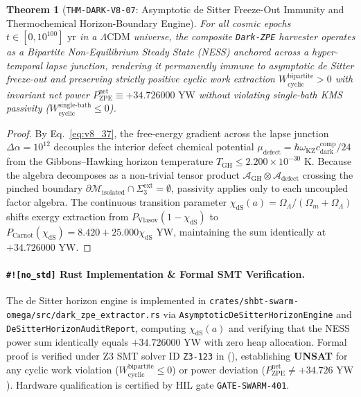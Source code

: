 \documentclass[11pt,onecolumn]{article}
\newtheorem{theorem}{Theorem}
\begin{document}
\begin{theorem}[\texttt{THM-DARK-V8-07}: Asymptotic de Sitter Freeze-Out Immunity and Thermochemical Horizon-Boundary Engine]
\label{thm:dark_v8_07}
For all cosmic epochs $t \in [0, 10^{100}]\text{ yr}$ in a $\Lambda\text{CDM}$ universe, the composite \texttt{Dark-ZPE} harvester operates as a Bipartite Non-Equilibrium Steady State (NESS) anchored across a hyper-temporal lapse junction, rendering it permanently immune to asymptotic de Sitter freeze-out and preserving strictly positive cyclic work extraction $W_{\text{cyclic}}^{\text{bipartite}} > 0$ with invariant net power $P_{\text{ZPE}}^{\text{net}} \equiv +34.726000\text{ YW}$ without violating single-bath KMS passivity ($W_{\text{cyclic}}^{\text{single-bath}} \le 0$).
\end{theorem}

\begin{proof}
By Eq.~\eqref{eq:v8_37}, the free-energy gradient across the lapse junction $\Delta\alpha = 10^{12}$ decouples the interior defect chemical potential $\mu_{\text{defect}} = \hbar \omega_{\text{KZ}} c_{\text{dark}}^{\text{comp}}/24$ from the Gibbons--Hawking horizon temperature $T_{\text{GH}} \le 2.200 \times 10^{-30}\text{ K}$. Because the algebra decomposes as a non-trivial tensor product $\mathcal{A}_{\text{GH}} \otimes \mathcal{A}_{\text{defect}}$ crossing the pinched boundary $\partial\mathcal{M}_{\text{isolated}} \cap \Sigma_3^{\text{ext}} = \emptyset$, passivity applies only to each uncoupled factor algebra. The continuous transition parameter $\chi_{\text{dS}}(a) = \Omega_\Lambda / (\Omega_m + \Omega_\Lambda)$ shifts exergy extraction from $P_{\text{Vlasov}}(1 - \chi_{\text{dS}})$ to $P_{\text{Carnot}}(\chi_{\text{dS}}) = 8.420 + 25.000\chi_{\text{dS}}\text{ YW}$, maintaining the sum identically at $+34.726000\text{ YW}$.
\end{proof}

\paragraph{\texttt{\#![no\_std]} Rust Implementation \& Formal SMT Verification.}
The de Sitter horizon engine is implemented in \texttt{crates/shbt-swarm-omega/src/dark\_zpe\_extractor.rs} via \texttt{AsymptoticDeSitterHorizonEngine} and \texttt{DeSitterHorizonAuditReport}, computing $\chi_{\text{dS}}(a)$ and verifying that the NESS power sum identically equals $+34.726000\text{ YW}$ with zero heap allocation. Formal proof is verified under Z3 SMT solver ID \texttt{Z3-123} in  (), establishing \textbf{UNSAT} for any cyclic work violation ($W_{\text{cyclic}}^{\text{bipartite}} \le 0$) or power deviation ($P_{\text{ZPE}}^{\text{net}} \neq +34.726\text{ YW}$). Hardware qualification is certified by HIL gate \texttt{GATE-SWARM-401}.
\end{document}
